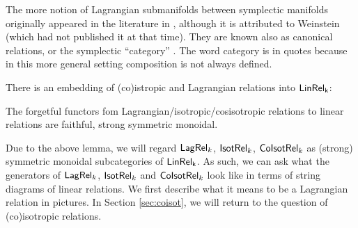 The more  notion of Lagrangian submanifolds between symplectic manifolds originally appeared in the literature in \cite{Guillemin}, although it is attributed to  Weinstein (which had not published it at that time).  They are known also as canonical relations, or the symplectic ``category'' \cite{weinsteinsymplectic}.  The word category is in quotes because in this more general setting composition is not always defined.




There is an embedding of (co)istropic and Lagrangian relations into $\sf LinRel_k$:
\begin{lemma}
\label{lemma:strong}
The forgetful functors fom Lagrangian/isotropic/cosisotropic relations to linear relations  are faithful, strong symmetric monoidal.
\end{lemma}
Due to the above lemma, we will regard $\mathsf{Lag}\mathsf{Rel}_k$, ${\sf Isot}\mathsf{Rel}_k$, ${\sf Co}{\sf Isot}\mathsf{Rel}_k$ as (strong) symmetric monoidal subcategories of $\sf LinRel_k$.
As such, we can ask what the generators of $\mathsf{Lag}\mathsf{Rel}_k$, ${\sf Isot}\mathsf{Rel}_k$ and ${\sf Co}{\sf Isot}\mathsf{Rel}_k$ look like in terms of string diagrams of linear relations. We first describe what it means to be a Lagrangian relation in pictures.  In Section \ref{sec:coisot}, we will return to the question of (co)isotropic relations.


